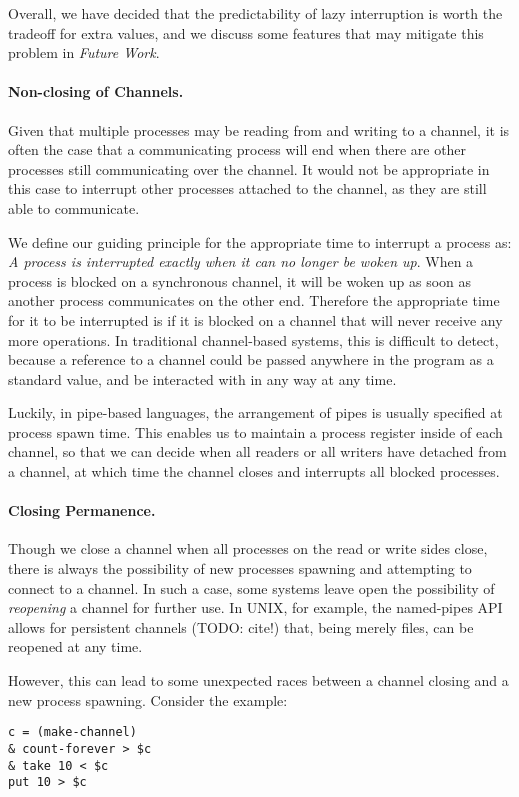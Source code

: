 \documentclass[english,preprint,JIP]{ipsj}
\begin{document}
Overall, we have decided that the predictability of lazy interruption is worth the tradeoff for extra values, and we discuss some features that may mitigate this problem in \emph{Future Work}.

\paragraph{Non-closing of Channels.}

Given that multiple processes may be reading from and writing to a channel, it is often the case that a communicating process will end when there are other processes still communicating over the channel. It would not be appropriate in this case to interrupt other processes attached to the channel, as they are still able to communicate.

We define our guiding principle for the appropriate time to interrupt a process as: \emph{A process is interrupted exactly when it can no longer be woken up}.
When a process is blocked on a synchronous channel, it will be woken up as soon as another process communicates on the other end.
Therefore the appropriate time for it to be interrupted is if it is blocked on a channel that will never receive any more operations.
In traditional channel-based systems, this is difficult to detect, because a reference to a channel could be passed anywhere in the program as a standard value, and be interacted with in any way at any time.

Luckily, in pipe-based languages, the arrangement of pipes is usually specified at process spawn time. This enables us to maintain a process register inside of each channel, so that we can decide when all readers or all writers have detached from a channel, at which time the channel closes and interrupts all blocked processes.

\paragraph{Closing Permanence.}
Though we close a channel when all processes on the read or write sides close, there is always the possibility of new processes spawning and attempting to connect to a channel. In such a case, some systems leave open the possibility of \emph{reopening} a channel for further use. In UNIX, for example, the named-pipes API allows for persistent channels (TODO: cite!) that, being merely files, can be reopened at any time.

However, this can lead to some unexpected races between a channel closing and a new process spawning. Consider the example:
\begin{lstlisting}
c = (make-channel)
& count-forever > $c
& take 10 < $c
put 10 > $c
\end{lstlisting}
\end{document}
